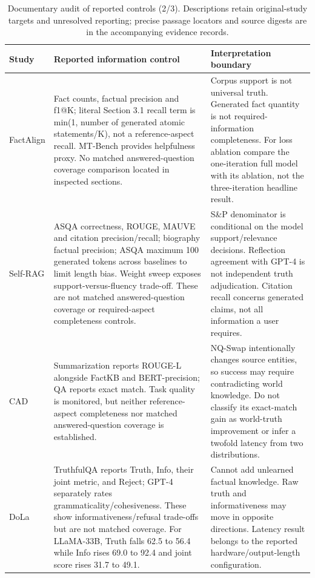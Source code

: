\begin{table}[tp]
\centering\small\setlength{\tabcolsep}{5pt}\renewcommand{\arraystretch}{1.12}
\begin{tabularx}{\textwidth}{@{}>{\raggedright\arraybackslash}p{}>{\raggedright\arraybackslash}p{}>{\raggedright\arraybackslash}X@{}}\toprule
Study & Reported information control & Interpretation boundary \\ \midrule
FactAlign \citep{huang-chen-2024-factalign} & Fact counts, factual precision and f1@K; literal Section 3.1 recall term is min(1, number of generated atomic statements/K), not a reference-aspect recall. MT-Bench provides helpfulness proxy. No matched answered-question coverage comparison located in inspected sections. & Corpus support is not universal truth. Generated fact quantity is not required-information completeness. For loss ablation compare the one-iteration full model with its ablation, not the three-iteration headline result. \\
Self-RAG \citep{extselfrag2024} & ASQA correctness, ROUGE, MAUVE and citation precision/recall; biography factual precision; ASQA maximum 100 generated tokens across baselines to limit length bias. Weight sweep exposes support-versus-fluency trade-off. These are not matched answered-question coverage or required-aspect completeness controls. & S\&P denominator is conditional on the model support/relevance decisions. Reflection agreement with GPT-4 is not independent truth adjudication. Citation recall concerns generated claims, not all information a user requires. \\
CAD \citep{shi-etal-2024-trusting} & Summarization reports ROUGE-L alongside FactKB and BERT-precision; QA reports exact match. Task quality is monitored, but neither reference-aspect completeness nor matched answered-question coverage is established. & NQ-Swap intentionally changes source entities, so success may require contradicting world knowledge. Do not classify its exact-match gain as world-truth improvement or infer a twofold latency from two distributions. \\
DoLa \citep{extdola2024} & TruthfulQA reports Truth, Info, their joint metric, and Reject; GPT-4 separately rates grammaticality/cohesiveness. These show informativeness/refusal trade-offs but are not matched coverage. For LLaMA-33B, Truth falls 62.5 to 56.4 while Info rises 69.0 to 92.4 and joint score rises 31.7 to 49.1. & Cannot add unlearned factual knowledge. Raw truth and informativeness may move in opposite directions. Latency result belongs to the reported hardware/output-length configuration. \\
\bottomrule\end{tabularx}
\caption{Documentary audit of reported controls (2/3). Descriptions retain original-study targets and unresolved reporting; precise passage locators and source digests are in the accompanying evidence records.}
\label{tab:audit-2}\end{table}


